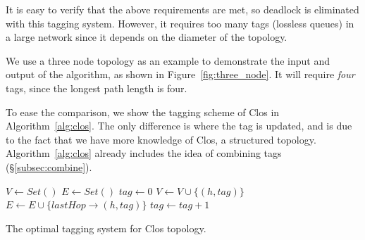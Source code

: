 It is easy to verify that the above requirements are met, so 
deadlock is eliminated with this tagging system. However, it requires 
too many tags (lossless queues) in a large network since it depends on the diameter of the topology.

We use a three node topology as an example to demonstrate the input and output of the 
algorithm, as shown in Figure~\ref{fig:three_node}. It will require {\em four} 
tags, since the longest path length is four.




 To ease the comparison, we show the tagging
scheme of Clos in Algorithm~\ref{alg:clos}. The only difference is where the tag
is updated, and is due to the fact that we have more knowledge of Clos, a structured topology.
Algorithm~\ref{alg:clos} already includes the idea of combining tags (\S\ref{subsec:combine}). 

\begin{algorithm}
	\small
	$V \gets Set()$\;
	$E \gets Set()$\; 
	 {
		$tag \gets 0$\;
		 {
			$V \gets V \cup \{(h, tag)\}$\;
			$E \gets E \cup \{lastHop\rightarrow(h, tag)\}$\;
			 {
				$tag \gets tag+1$\;
			}
		}
	}
	\;
    \caption{The optimal tagging system for Clos topology.}
	\label{alg:clos}
\end{algorithm}



